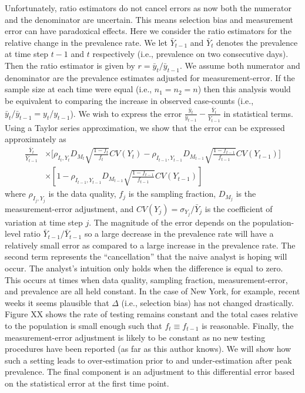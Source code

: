 \documentclass[11pt]{amsart}
\begin{document}
Unfortunately, ratio estimators do not cancel errors as now both the numerator and the denominator are uncertain.  This means selection bias and measurement error can have paradoxical effects.  Here we consider the ratio estimators for the relative change in the prevalence rate.  We let $\bar Y_{t-1}$ and $\bar Y_{t}$ denotes the prevalence at time step $t-1$ and $t$ respectively (i.e., prevalence on two consecutive days).  Then the ratio estimator is given by $r = \bar y_t / \bar y_{t-1}$.  We assume both numerator and denominator are the prevalence estimates adjusted for measurement-error. If the sample size at each time were equal (i.e., $n_1 = n_2 = n$) then this analysis would be equivalent to comparing the increase in observed case-counts (i.e., $\bar y_t/\bar y_{t-1} = y_t/y_{t-1}$).  We wish to express the error $\frac{\bar y_t}{\bar y_{t-1}} - \frac{\bar Y_{t}}{\bar Y_{t-1}}$ in statistical terms.  Using a Taylor series approximation, we show that the error can be expressed approximately as
$$
\begin{aligned}
\frac{\bar Y_t}{\bar Y_{t-1}} &\times \bigg[ \rho_{I_t,Y_t} D_{M_t} \sqrt{\frac{1-f_t}{f_t}} CV (Y_t)  -\rho_{I_{t-1},Y_{t-1}} D_{M_{t-1}} \sqrt{\frac{1-f_{t-1}}{f_{t-1}}} CV (Y_{t-1}) \bigg] \\
&\times \left[ 1 - \rho_{I_{t-1},Y_{t-1}} D_{M_{t-1}} \sqrt{\frac{1-f_{t-1}}{f_{t-1}}} CV (Y_{t-1}) \right]
\end{aligned}
$$
where $\rho_{I_j, Y_j}$ is the data quality, $f_j$ is the sampling fraction, $D_{M_j}$ is the measurement-error adjustment, and $CV(Y_j) = \sigma_{Y_j}/\bar Y_j$ is the coefficient of variation at time step $j$.  The magnitude of the error depends on the population-level ratio $\bar Y_{t-1} / \bar Y_{t-1}$ so a large decrease in the prevalence rate will have a relatively small error as compared to a large increase in the prevalence rate. The second term represents the ``cancellation'' that the naive analyst is hoping will occur.  The analyst's intuition only holds when the difference is equal to zero.  This occurs at times when data quality, sampling fraction, measurement-error, and prevalence are all held constant.  In the case of New York, for example, recent weeks it seems plausible that $\Delta$ (i.e., selection bias) has not changed drastically.  Figure XX shows the rate of testing remains constant and the total cases relative to the population is small enough such that $f_t \equiv f_{t-1}$ is reasonable. Finally, the measurement-error adjustment is likely to be constant as no new testing procedures have been reported (as far as this author knows).  We will show how such a setting leads to over-estimation prior to and under-estimation after peak prevalence.  The final component is an adjustment to this differential error based on the statistical error at the first time point.
\end{document}
